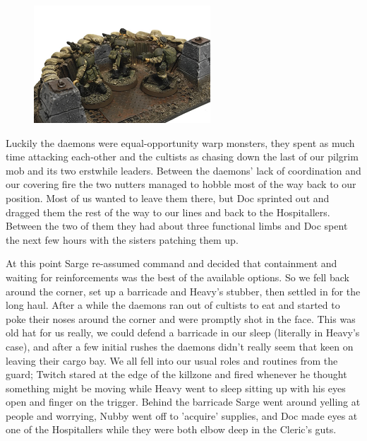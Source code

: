 \begin{figure}
	\begin{center}
		\includegraphics[width=\figwidth]{pics/2/13.png}
	\end{center}
\end{figure}
Luckily the daemons were equal-opportunity warp monsters, they spent as much time attacking each-other and the cultists as chasing down the last of our pilgrim mob and its two erstwhile leaders. 
Between the daemons' lack of coordination and our covering fire the two nutters managed to hobble most of the way back to our position. 
Most of us wanted to leave them there, but Doc sprinted out and dragged them the rest of the way to our lines and back to the Hospitallers. 
Between the two of them they had about three functional limbs and Doc spent the next few hours with the sisters patching them up.

At this point Sarge re-assumed command and decided that containment and waiting for reinforcements was the best of the available options. 
So we fell back around the corner, set up a barricade and Heavy's stubber, then settled in for the long haul. 
After a while the daemons ran out of cultists to eat and started to poke their noses around the corner and were promptly shot in the face. 
This was old hat for us really, we could defend a barricade in our sleep (literally in Heavy's case), and after a few initial rushes the daemons didn't really seem that keen on leaving their cargo bay. 
We all fell into our usual roles and routines from the guard; Twitch stared at the edge of the killzone and fired whenever he thought something might be moving while Heavy went to sleep sitting up with his eyes open and finger on the trigger. 
Behind the barricade Sarge went around yelling at people and worrying, Nubby went off to 'acquire' supplies, and Doc made eyes at one of the Hospitallers while they were both elbow deep in the Cleric's guts.


